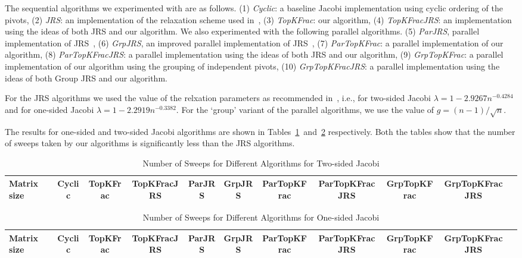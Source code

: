 \documentclass[10pt, conference, compsocconf]{IEEEtran}
\begin{document}
The sequential algorithms we experimented with are as follows. (1) \emph{Cyclic}:  a baseline Jacobi implementation using cyclic ordering of the pivots, (2) \emph{JRS}: an implementation of the relaxation scheme used in~\cite{rajasekaran2008relaxation}, (3) \emph{TopKFrac}: our algorithm, (4) \emph{TopKFracJRS}: an implementation using the ideas of both JRS and our algorithm. We also experimented with the following parallel algorithms. (5) \emph{ParJRS}, parallel implementation of JRS~\cite{rajasekaran2008relaxation}, (6) \emph{GrpJRS}, an improved parallel implementation of JRS~\cite{rajasekaran2008relaxation}, (7) \emph{ParTopKFrac}: a parallel implementation of our algorithm, (8) \emph{ParTopKFracJRS}: a parallel implementation using the ideas of both JRS and our algorithm, (9)   \emph{GrpTopKFrac}: a parallel implementation of our algorithm using the grouping of independent pivots, (10) \emph{GrpTopKFracJRS}: a parallel implementation using the ideas of both Group JRS and our algorithm.

For the JRS algorithms we used the value of the relxation parameters as recommended in~\cite{rajasekaran2008relaxation}, i.e., for two-sided Jacobi $\lambda = 1- 2.9267n^{-0.4284}$ and for one-sided Jacobi $\lambda = 1 - 2.2919 n^{-0.3382}$. For the `group' variant of the parallel algorithms, we use the value of $g = (n-1)/\sqrt{n}$. 

The results for one-sided and two-sided Jacobi algorithms are shown in Tables~\ref{tab:twosided}~and~\ref{tab:onesided} respectively. Both the tables show that the number of sweeps taken by our algorithms is significantly less than the JRS algorithms.

\begin{table}
  \centering
  \caption{Number of Sweeps for Different Algorithms for Two-sided Jacobi}
  \label{tab:twosided}
  \begin{tabular}{lcccccccccc}
    \toprule
    Matrix size & Cyclic & TopKFrac & TopKFracJRS & ParJRS & GrpJRS & ParTopKFrac & ParTopKFracJRS & GrpTopKFrac & GrpTopKFracJRS \\
    \midrule
    
    \bottomrule
  \end{tabular}
\end{table}


\begin{table}
  \centering
  \caption{Number of Sweeps for Different Algorithms for One-sided Jacobi}
  \label{tab:onesided}
  \begin{tabular}{lcccccccccc}
    \toprule
    Matrix size & Cyclic & TopKFrac & TopKFracJRS & ParJRS & GrpJRS & ParTopKFrac & ParTopKFracJRS & GrpTopKFrac & GrpTopKFracJRS \\
    \midrule
    
    \bottomrule
  \end{tabular}
\end{table}
\end{document}
